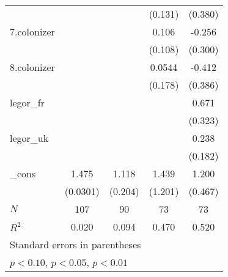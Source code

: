 {\begin{tabular}{l*{4}{c}}
            &                     &                     &     (0.131)         &     (0.380)         \\
[1em]
7.colonizer &                     &                     &       0.106         &      -0.256         \\
            &                     &                     &     (0.108)         &     (0.300)         \\
[1em]
8.colonizer &                     &                     &      0.0544         &      -0.412         \\
            &                     &                     &     (0.178)         &     (0.386)         \\
[1em]
legor\_fr    &                     &                     &                     &       0.671\sym{*}  \\
            &                     &                     &                     &     (0.323)         \\
[1em]
legor\_uk    &                     &                     &                     &       0.238         \\
            &                     &                     &                     &     (0.182)         \\
[1em]
\_cons      &       1.475\sym{***}&       1.118\sym{***}&       1.439         &       1.200\sym{**} \\
            &    (0.0301)         &     (0.204)         &     (1.201)         &     (0.467)         \\
\hline
\(N\)       &         107         &          90         &          73         &          73         \\
\(R^{2}\)   &       0.020         &       0.094         &       0.470         &       0.520         \\
\hline\hline
\multicolumn{5}{l}{\footnotesize Standard errors in parentheses}\\
\multicolumn{5}{l}{\footnotesize \sym{*} \(p<0.10\), \sym{**} \(p<0.05\), \sym{***} \(p<0.01\)}\\
\end{tabular}
}
